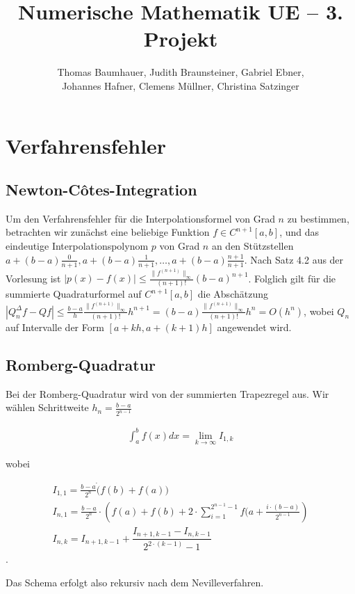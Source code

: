 \documentclass{scrbook}
\begin{document}
\title{Numerische Mathematik UE -- 3. Projekt}
\author{Thomas Baumhauer, Judith Braunsteiner, Gabriel Ebner, \\
  Johannes Hafner, Clemens Müllner, Christina Satzinger}
\maketitle

\chapter{Verfahrensfehler}

\section{Newton-Côtes-Integration}

Um den Verfahrensfehler für die Interpolationsformel von Grad \(n\) zu
bestimmen, betrachten wir zunächst eine beliebige Funktion \(f \in
C^{n+1}[a,b]\), und das eindeutige Interpolationspolynom \(p\) von Grad \(n\)
an den Stützstellen \(a + (b-a)\frac{0}{n+1}, a + (b-a)\frac{1}{n+1}, \dots, a
+ (b-a)\frac{n+1}{n+1}\).  Nach Satz 4.2 aus der Vorlesung ist \(|p(x) - f(x)|
\leq \frac{\|f^{(n+1)}\|_\infty}{(n+1)!}(b-a)^{n+1}\).  Folglich gilt für die
summierte Quadraturformel auf \(C^{n+1}[a,b]\) die Abschätzung \(|Q^{\Delta}_n
f - Q f| \leq \frac {b-a} h \frac{\|f^{(n+1)}\|_\infty}{(n+1)!}h^{n+1} = (b-a)
\frac{\|f^{(n+1)}\|_\infty}{(n+1)!}h^n = O(h^n)\), wobei \(Q_n\) auf Intervalle
der Form \([a + kh, a + (k+1)h]\) angewendet wird.


\section{Romberg-Quadratur}

Bei der Romberg-Quadratur wird von der summierten Trapezregel aus.
Wir wählen Schrittweite $h_n = \frac{b-a}{2^{n-1}}$

\begin{align*}
\int_a^b f(x) dx = \lim_{k \rightarrow \infty} I_{1,k}
\end{align*}

wobei 

\begin{align*}
I_{1,1} = \frac{b-a}{2^n} \dot (f(b) + f(a))\\
I_{n,1} = \frac{b-a}{2^n} \cdot \left( f(a) + f(b) + 2 \cdot \sum_{i = 1}^{2^{n-1}-1} f(a + \frac{i \cdot (b-a)}{2^{n-1}} \right)\\
I_{n,k} = I_{n+1, k-1} + \dfrac{I_{n+1, k-1} - I_{n, k-1}}{2^{2 \cdot (k-1)}-1}
\end{align*}.

Das Schema erfolgt also rekursiv nach dem Nevilleverfahren.
\end{document}
